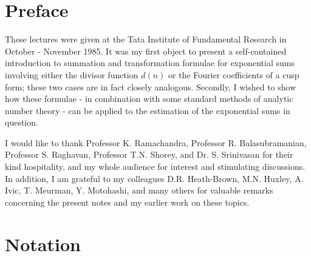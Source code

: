 \chapter{Preface}



\indent These lectures were given at the Tata Institute  of Fundamental
Research in October - November 1985. It was my first object to present
a self-contained introduction to summation and transformation formulae
for exponential sums involving either the divisor function $d(n)$ or
the Fourier coefficients of a cusp form; these two cases are in fact
closely analogous. Secondly, I wished to show how these formulae - in
combination with some standard methods of analytic number theory - can
be applied to the estimation of the exponential sums in question. 

I would like to thank Professor K. Ramachandra, Professor
R. Balasubramanian, Professor S. Raghavan, Professor T.N. Shorey, and
Dr. S. Srinivasan for their kind hospitality, and my whole audience
for interest and stimulating discussions. In addition, I am grateful
to my colleagues D.R. Heath-Brown, M.N. Huxley, A. Ivic, T. Meurman,
Y. Motohashi, and many others for valuable remarks concerning the
present notes and my earlier work on these topics.


\chapter{Notation}


